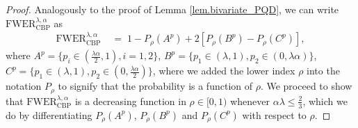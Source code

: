 \documentclass {imsart}
\newcommand{\FWERcb}{\mathrm{FWER}_{\mathrm{CBP}}^{\lambda,\alpha}}
\begin{document}
\begin{proof}
Analogously to the proof of Lemma \ref{lem.bivariate_PQD}, we can write $\FWERcb$ as
\begin{align}
\label{eqn.Fs}
\FWERcb&\;=\;1-P_{\!\!\rho}(A^p)+2[P_{\!\!\rho}(B^p)-P_{\!\!\rho}(C^p)],
\end{align}
where $A^p=\{p_i\in(\tfrac{\lambda\alpha}{2},1),i=1,2\}$, $B^p=\{p_1\in(\lambda,1),p_2\in(0,\lambda\alpha)\}$, $C^p=\{p_1\in(\lambda,1),p_2\in(0,\tfrac{\lambda\alpha}{2})\}$, where we added the lower index $\rho$ into the notation $P_{\!\!\rho}$ to signify that the probability is a function of $\rho$. We proceed to show that $\FWERcb$ is a decreasing function in $\rho\in[0,1)$ whenever $\alpha\lambda\leq\frac{2}{3}$, which we do by differentiating $P_{\!\!\rho}(A^p)$, $P_{\!\!\rho}(B^p)$ and $P_{\!\!\rho}(C^p)$ with respect to $\rho$.


\end{proof}
\end{document}
